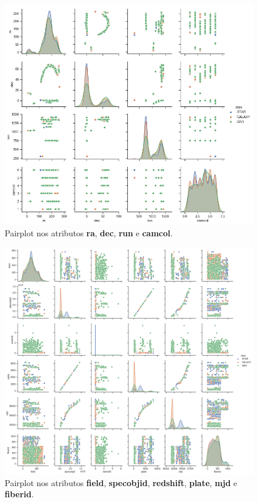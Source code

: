 \begin{figure}[H]
  \centering
  \includegraphics[width=\textwidth]{pdf/snsplot2.png}
  \caption{Pairplot nos atributos \textbf{ra}, \textbf{dec}, \textbf{run} e \textbf{camcol}.}
  \label{fig:pairplot2}
\end{figure}

\begin{figure}[H]
  \centering
  \includegraphics[width=\textwidth]{pdf/snsplot3.png}
  \caption{Pairplot nos atributos \textbf{field}, \textbf{specobjid}, \textbf{redshift}, \textbf{plate}, \textbf{mjd} e \textbf{fiberid}.}
  \label{fig:pairplot3}
\end{figure}

